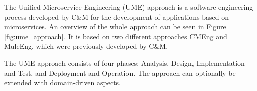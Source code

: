 




The Unified Microservice Engineering (UME) approach is a software engineering
process developed by C\&M for the development of applications based on microservices.
An overview of the whole approach can be seen in Figure \ref{fig:ume_approach}.
It is based on two different approaches CMEng and MuleEng,
which were previously developed by C\&M.


The UME approach consists of four phases: Analysis, Design, Implementation and Test,
and Deployment and Operation. The approach can optionally be extended with domain-driven aspects.

